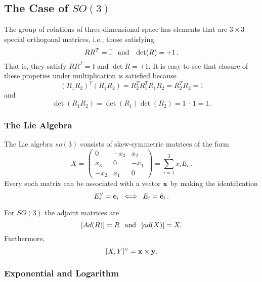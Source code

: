 \documentclass{svmult}
\newcommand{\II}{\mathbb{I}}
\begin{document}
\subsection{The Case of $SO(3)$}

The group of rotations of three-dimensional space has elements that are $3\times 3$ special orthogonal matrices, i.e., those satisfying
$$ R R^T = \II \,\,\,\,\, {\rm and} \,\,\,\,\, \det(R) = +1\,. $$
That is, they satisfy $R R^T = \II$ and $\det R = +1$. It is easy to see that closure of these propeties under multiplication is satisfied because
$$ (R_1 R_2)^T (R_1 R_2) = R_2^T R_1^T R_1 R_2 = R_2^T R_2 = \II $$
and
$$ \det(R_1 R_2) = \det(R_1) \det(R_2) = 1\,\cdot\,1 = 1. $$

\subsubsection{The Lie Algebra}

The Lie algebra $so(3)$ consists of skew-symmetric matrices of the form
\begin{equation}
{X} = \left(\begin{array}{ccc}
0 & -x_3 & x_2 \\
x_3 & 0 & -x_1 \\
-x_2 & x_1 & 0
\end{array} \right) = \sum_{i=1}^{3} x_i E_i\,.
\label{skew}
\end{equation}
Every such matrix can be associated with a vector ${\bf x}$ by making the identification
$$ E_{i}^{\vee} = {\bf e}_i\,\,\,\Longleftrightarrow\,\,\,
E_{i} = \hat{\bf e}_i\,. $$

For $SO(3)$ the adjoint matrices are
$$ [Ad(R)] = R \hskip 0.1 true in {\rm and} \hskip 0.1 true in [ad(X)] = X. $$
Furthermore,
$$ [X,Y]^{\vee} = {\bf x} \times {\bf y}. $$

\subsubsection{Exponential and Logarithm}
\end{document}
